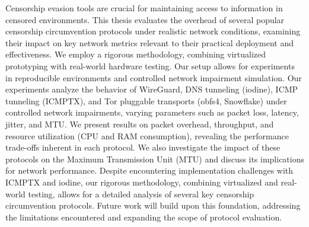 
Censorship evasion tools are crucial for maintaining access to information in censored environments.
This thesis evaluates the overhead of several popular censorship circumvention protocols under realistic network conditions, examining their impact on key network metrics relevant to their practical deployment and effectiveness.
We employ a rigorous methodology, combining virtualized prototyping with real-world hardware testing.
Our setup allows for experiments in reproducible environments and controlled network impairment simulation.
Our experiments analyze the behavior of WireGuard, DNS tunneling (iodine), ICMP tunneling (ICMPTX), and Tor pluggable transports (obfs4, Snowflake) under controlled network impairments, varying parameters such as packet loss, latency, jitter, and MTU.
We present results on packet overhead, throughput, and resource utilization (CPU and RAM consumption), revealing the performance trade-offs inherent in each protocol.
We also investigate the impact of these protocols on the Maximum Transmission Unit (MTU) and discuss its implications for network performance.
Despite encountering implementation challenges with ICMPTX and iodine, our rigorous methodology, combining virtualized and real-world testing, allows for a detailed analysis of several key censorship circumvention protocols.
Future work will build upon this foundation, addressing the limitations encountered and expanding the scope of protocol evaluation.



